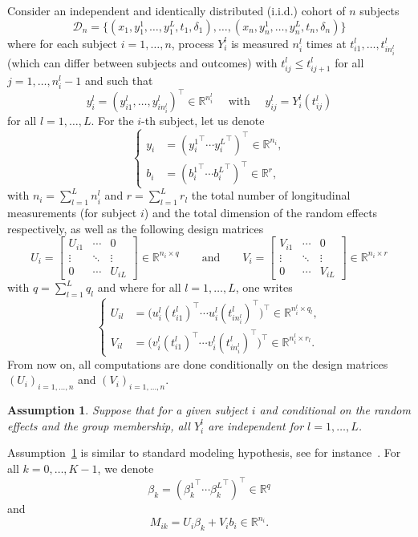 \documentclass[11pt]{article}
\newtheorem{assumption}{Assumption}{\bf}{\rm}
\newcommand{\cD}{\mathcal D}
\newcommand{\R}{\mathds R}
\begin{document}
Consider an independent and identically distributed (i.i.d.) cohort of $n$ subjects
\[ \cD_n = \big\{ (x_1, y_1^1, \ldots, y_1^L, t_1, \delta_1), \ldots, (x_n, y_n^1, \ldots, y_n^L, t_n, \delta_n) \big\} \]
where for each subject $i=1, \ldots, n$, process $Y_i^l$ is measured $n_i^l$ times at $t_{i1}^l, \ldots, t_{in_i^l}^l$ (which can differ between subjects and outcomes) with $t_{ij}^l \leq t_{ij+1}^l$ for all $j=1, \ldots, n_i^l-1$ and such that
\[ y_i^l=(y_{i1}^l, \ldots, y_{in_i^l}^l)^\top \in \R^{n_i^l} \quad \text{ with } \quad y_{ij}^l=Y_i^l(t_{ij}^l) \]
for all $l=1, \ldots, L$. 
For the $i$-th subject, let us denote 
\[
\left\{
    \begin{array}{ll}
        y_i &= ({y_i^1}^\top \cdots {y_i^L}^\top)^\top \in \R^{n_i},\\
        b_i &= ({b_i^1}^\top \cdots {b_i^L}^\top)^\top \in \R^r,
    \end{array}
\right.
\]
with $n_i = \sum_{l=1}^L n_i^l$ and $r = \sum_{l=1}^L r_l$ the total number of longitudinal measurements (for subject $i$) and the total dimension of the random effects respectively, as well as the following design matrices
\[ U_i = 
\begin{bmatrix}
  U_{i1} & \cdots & 0\\
  \vdots &  \ddots & \vdots \\
  0 & \cdots & U_{iL}
\end{bmatrix} 
\in \R^{n_i \times q}
\qquad \text{and} \qquad
V_i = 
\begin{bmatrix}
  V_{i1} & \cdots & 0\\
  \vdots &  \ddots & \vdots \\
  0 & \cdots & V_{iL}
\end{bmatrix}
\in \R^{n_i \times r}
\]
with $q = \sum_{l=1}^L q_l$ and where for all $l=1, \ldots, L$, one writes
\[
\left\{
    \begin{array}{ll}
        U_{il} &= \big(u_i^l(t_{i1}^l)^\top \cdots u_i^l(t_{in_i^l}^l)^\top\big)^\top \in \R^{n_i^l \times q_l},\\
        V_{il} &= \big(v_i^l(t_{i1}^l)^\top \cdots v_i^l(t_{in_i^l}^l)^\top\big)^\top \in \R^{n_i^l \times r_l}.
    \end{array}
\right.
\]
From now on, all computations are done conditionally on the design matrices $(U_i)_{i=1, \dots, n}$ and $(V_i)_{i=1, \dots, n}$.
\begin{assumption}
\label{indep-hyp-2}
Suppose that for a given subject $i$ and conditional on the random effects and the group membership, all $Y_i^l$ are independent for $l=1, \dots, L$.
\end{assumption}
Assumption~\ref{indep-hyp-2} is similar to standard modeling hypothesis, see for instance~\citet{tsiatis2004joint}.
For all $k = 0, \ldots, K-1$, we denote 
\[ \beta_k = ({\beta_k^1}^\top \cdots {\beta_k^L}^\top)^\top \in \R^q \] 
and 
\[M_{ik} = U_i\beta_k + V_ib_i \in \R^{n_i}. \]
\end{document}

